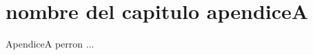 \chapter{nombre del capitulo apendiceA}\label{ApendiceA}\graphicspath{{06-Apendices/A/Figuras/}}
ApendiceA perron ...